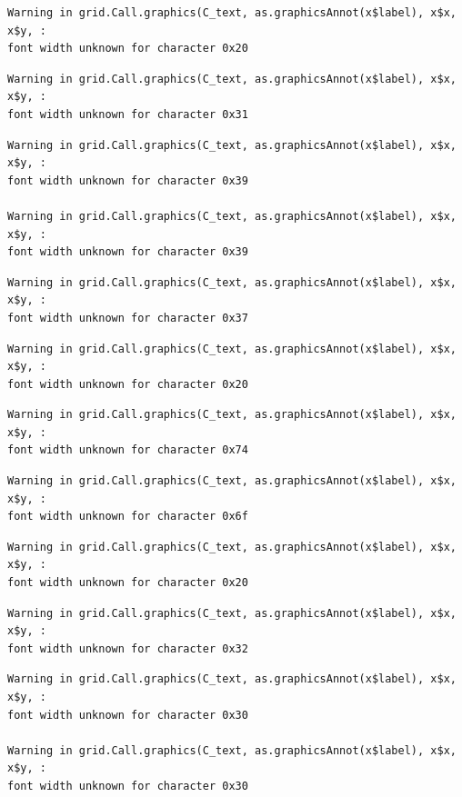 \documentclass[
  letterpaper,
  DIV=11,
  numbers=noendperiod]{scrreprt}
\begin{document}
\begin{verbatim}
Warning in grid.Call.graphics(C_text, as.graphicsAnnot(x$label), x$x, x$y, :
font width unknown for character 0x20
\end{verbatim}

\begin{verbatim}
Warning in grid.Call.graphics(C_text, as.graphicsAnnot(x$label), x$x, x$y, :
font width unknown for character 0x31
\end{verbatim}

\begin{verbatim}
Warning in grid.Call.graphics(C_text, as.graphicsAnnot(x$label), x$x, x$y, :
font width unknown for character 0x39

Warning in grid.Call.graphics(C_text, as.graphicsAnnot(x$label), x$x, x$y, :
font width unknown for character 0x39
\end{verbatim}

\begin{verbatim}
Warning in grid.Call.graphics(C_text, as.graphicsAnnot(x$label), x$x, x$y, :
font width unknown for character 0x37
\end{verbatim}

\begin{verbatim}
Warning in grid.Call.graphics(C_text, as.graphicsAnnot(x$label), x$x, x$y, :
font width unknown for character 0x20
\end{verbatim}

\begin{verbatim}
Warning in grid.Call.graphics(C_text, as.graphicsAnnot(x$label), x$x, x$y, :
font width unknown for character 0x74
\end{verbatim}

\begin{verbatim}
Warning in grid.Call.graphics(C_text, as.graphicsAnnot(x$label), x$x, x$y, :
font width unknown for character 0x6f
\end{verbatim}

\begin{verbatim}
Warning in grid.Call.graphics(C_text, as.graphicsAnnot(x$label), x$x, x$y, :
font width unknown for character 0x20
\end{verbatim}

\begin{verbatim}
Warning in grid.Call.graphics(C_text, as.graphicsAnnot(x$label), x$x, x$y, :
font width unknown for character 0x32
\end{verbatim}

\begin{verbatim}
Warning in grid.Call.graphics(C_text, as.graphicsAnnot(x$label), x$x, x$y, :
font width unknown for character 0x30

Warning in grid.Call.graphics(C_text, as.graphicsAnnot(x$label), x$x, x$y, :
font width unknown for character 0x30
\end{verbatim}
\end{document}
